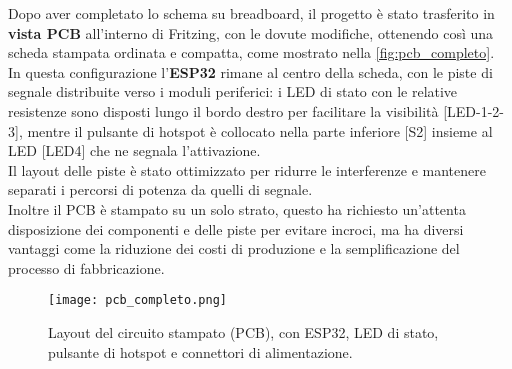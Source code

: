 Dopo aver completato lo schema su breadboard, il progetto è stato trasferito in \textbf{vista PCB} 
all’interno di Fritzing, con le dovute modifiche, ottenendo così una scheda stampata ordinata e compatta, come mostrato nella \autoref{fig:pcb_completo}.\\ 
In questa configurazione l’\textbf{ESP32} rimane al centro della scheda, con le piste di segnale distribuite verso i moduli periferici: 
i LED di stato con le relative resistenze sono disposti lungo il bordo destro per facilitare la visibilità [LED-1-2-3], mentre il pulsante di hotspot 
è collocato nella parte inferiore [S2] insieme al LED [LED4] che ne segnala l’attivazione. \\
Il layout delle piste è stato ottimizzato per ridurre le interferenze e mantenere separati i percorsi di potenza da quelli di segnale.\\
Inoltre il PCB è stampato su un solo strato, questo ha richiesto un'attenta disposizione dei componenti e delle piste per evitare incroci, 
ma ha diversi vantaggi come la riduzione dei costi di produzione e la semplificazione del processo di fabbricazione.\\

\begin{figure}[H]
  \centering
  \texttt{[image: pcb\_completo.png]}
  \caption{Layout del circuito stampato (PCB), con ESP32, LED di stato, pulsante di hotspot e connettori di alimentazione.}
  \label{fig:pcb_completo}
\end{figure}
